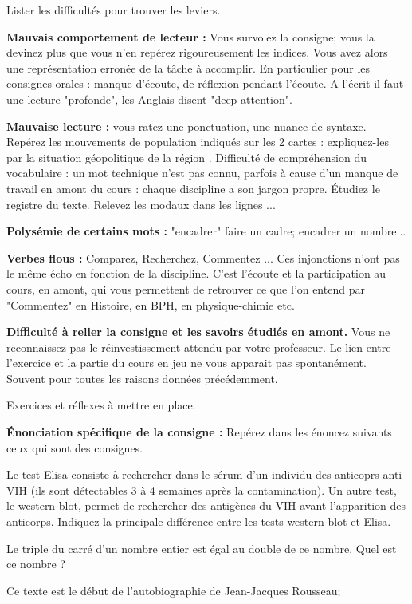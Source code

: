 
\numeroQuestion Lister les difficultés pour trouver les leviers.
\begin{listePoints}
  \item \textbf{Mauvais comportement de lecteur :} Vous survolez la consigne; vous la devinez plus que vous n'en repérez rigoureusement les indices. Vous avez alors une représentation erronée de la tâche à accomplir. En particulier pour les consignes orales : manque d'écoute, de réflexion pendant l'écoute. A l'écrit il faut une lecture "profonde", les Anglais disent "deep attention".
  \item \textbf{Mauvaise lecture :} vous ratez une ponctuation, une nuance de syntaxe. \og Repérez les mouvements de population indiqués sur les 2 cartes : expliquez-les par la situation géopolitique de la région \fg. Difficulté de compréhension du vocabulaire : un mot technique n'est pas connu, parfois à cause d'un manque de travail en amont du cours : chaque discipline a son jargon propre. \og Étudiez le registre du texte. Relevez les modaux dans les lignes \fg...
  \item \textbf{Polysémie de certains mots :} "encadrer" faire un cadre; encadrer un nombre...
  \item \textbf{Verbes flous :} Comparez, Recherchez, Commentez ... Ces injonctions n'ont pas le même écho en fonction de la discipline. C'est l'écoute et la participation au cours, en amont, qui vous permettent de retrouver ce que l'on entend par "Commentez" en Histoire, en BPH, en physique-chimie etc.
  \item \textbf{Difficulté à relier la consigne et les savoirs étudiés en amont.} Vous ne reconnaissez pas le réinvestissement attendu par votre professeur. Le lien entre l'exercice et la partie du cours en jeu ne vous apparait pas spontanément. Souvent pour toutes les raisons données précédemment.
\end{listePoints}

\numeroQuestion Exercices et réflexes à mettre en place.

\hspace{16pt}\pointCyan \textbf{Énonciation spécifique de la consigne :} Repérez dans les énoncez suivants ceux qui sont des
consignes.

\begin{encart}
  Le test Elisa consiste à rechercher dans le sérum d'un individu des anticoprs anti VIH (ils sont détectables 3 à 4 semaines après la contamination).
  Un autre test, le western blot, permet de rechercher des antigènes du VIH avant l'apparition des anticorps. 
  Indiquez la principale différence entre les tests western blot et Elisa.
\end{encart}
\begin{encart}
  Le triple du carré d'un nombre entier est égal au double de ce nombre. Quel est ce nombre ?
\end{encart}
\begin{encart}
  Ce texte est le début de l'autobiographie de Jean-Jacques Rousseau;
\end{encart}

